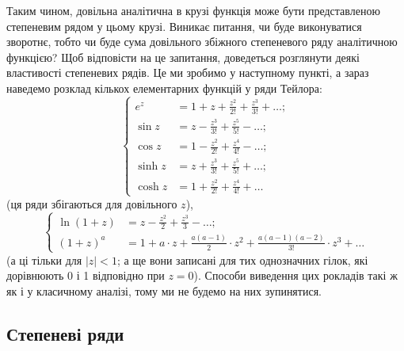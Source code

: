 Таким чином, довільна аналітична в крузі функція може бути представленою степеневим рядом у цьому крузі. Виникає питання, чи буде виконуватися зворотнє, тобто чи буде сума довільного збіжного степеневого ряду аналітичною функцією? Щоб відповісти на це запитання, доведеться розглянути деякі властивості степеневих рядів. Це ми зробимо у наступному пункті, а зараз наведемо розклад кількох елементарних функцій у ряди Тейлора:
\begin{equation}
	\label{eq:5.1.5}
	\left\{\begin{aligned}
		e^z &= 1 + z + \frac{z^2}{2!} + \frac{z^3}{3!} + \ldots ; \\
		\sin z &= z - \frac{z^3}{3!} + \frac{z^5}{5!} - \ldots ; \\
		\cos z &= 1 - \frac{z^2}{2!} + \frac{z^4}{4!} - \ldots ; \\
		\sinh z &= z + \frac{z^3}{3!} + \frac{z^5}{5!} + \ldots ; \\
		\cosh z &= 1 + \frac{z^2}{2!} + \frac{z^4}{4!} + \ldots
	\end{aligned}\right.
\end{equation}
(ця ряди збігаються для довільного $z$),
\begin{equation}
	\label{eq:5.1.6}
	\left\{\begin{aligned}
		\ln(1+z) &= z - \frac{z^2}{2} + \frac{z^3}{3} - \ldots ; \\
		(1 + z)^a &= 1 + a \cdot z + \frac{a(a-1)}{2} \cdot z^2 + \frac{a(a-1)(a-2)}{3!} \cdot z^3 + \ldots
	\end{aligned}\right.
\end{equation}
(а ці тільки для $|z|<1$; а ще вони записані для тих однозначних гілок, які дорівнюють 0 і 1 відповідно при $z = 0$). Способи виведення цих рокладів такі ж як і у класичному аналізі, тому ми не будемо на них зупинятися.

\subsection{Степеневі ряди}

